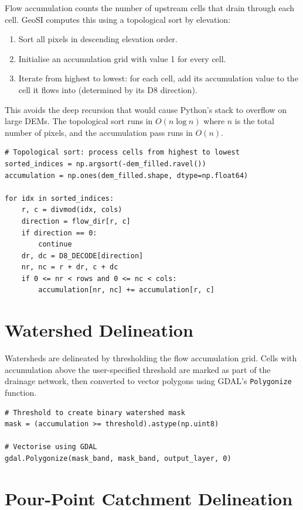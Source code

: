 Flow accumulation counts the number of upstream cells that drain through each
cell.  GeoSI computes this using a topological sort by elevation:

\begin{enumerate}
  \item Sort all pixels in descending elevation order.
  \item Initialise an accumulation grid with value 1 for every cell.
  \item Iterate from highest to lowest: for each cell, add its accumulation
        value to the cell it flows into (determined by its D8 direction).
\end{enumerate}

This avoids the deep recursion that would cause Python's stack to overflow on
large DEMs.  The topological sort runs in $O(n \log n)$ where $n$ is the total
number of pixels, and the accumulation pass runs in $O(n)$.

\begin{lstlisting}
# Topological sort: process cells from highest to lowest
sorted_indices = np.argsort(-dem_filled.ravel())
accumulation = np.ones(dem_filled.shape, dtype=np.float64)

for idx in sorted_indices:
    r, c = divmod(idx, cols)
    direction = flow_dir[r, c]
    if direction == 0:
        continue
    dr, dc = D8_DECODE[direction]
    nr, nc = r + dr, c + dc
    if 0 <= nr < rows and 0 <= nc < cols:
        accumulation[nr, nc] += accumulation[r, c]
\end{lstlisting}

\section{Watershed Delineation}

Watersheds are delineated by thresholding the flow accumulation grid.  Cells
with accumulation above the user-specified threshold are marked as part of the
drainage network, then converted to vector polygons using GDAL's
\texttt{Polygonize} function.

\begin{lstlisting}
# Threshold to create binary watershed mask
mask = (accumulation >= threshold).astype(np.uint8)

# Vectorise using GDAL
gdal.Polygonize(mask_band, mask_band, output_layer, 0)
\end{lstlisting}

\section{Pour-Point Catchment Delineation}

